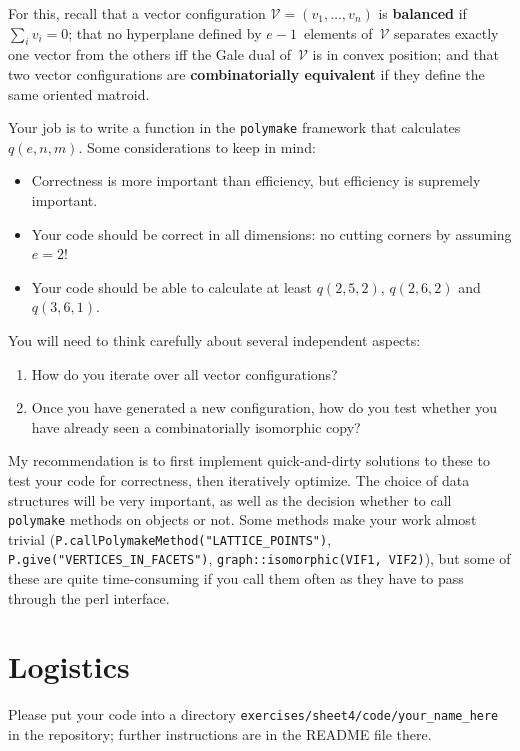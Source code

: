 \documentclass[11pt]{amsart}
\newcommand{\VV}{\mathcal{V}}
\newcommand{\defn}[1]{\textbf{\color{blue}#1}} %
\begin{document}
For this, recall 
that a vector configuration $\VV = (v_1,\dots,v_n)$ is \defn{balanced} if $\sum_i v_i=0$;
that no hyperplane defined by $e-1$~elements of~$\VV$ separates   exactly one vector from the others iff the Gale dual of~$\VV$ is in   convex position;
and that two vector configurations are \defn{combinatorially equivalent} if they define the same oriented matroid.

\bigskip
Your job is to write a function in the \texttt{polymake} framework that calculates $q(e,n,m)$. Some considerations to keep in mind:
\begin{itemize}
\item Correctness is more important than efficiency, but efficiency is supremely important.
\item Your code should be correct in all dimensions: no cutting corners by assuming $e=2$!
\item Your code should be able to calculate at least $q(2,5,2)$, $q(2,6,2)$ and $q(3,6,1)$.
\end{itemize}

You will need to think carefully about several independent aspects:
\begin{enumerate}
\item How do you iterate over all vector configurations?
\item Once you have generated a new configuration, how do you test whether you have already seen a combinatorially isomorphic copy?
\end{enumerate}

My recommendation is to first implement quick-and-dirty solutions to these to test your code for correctness, then iteratively optimize. The choice of data structures will be very important, as well as the decision whether to call \texttt{polymake} methods on objects or not. Some methods make your work almost trivial (\texttt{P.callPolymakeMethod("LATTICE\_POINTS")}, \texttt{P.give("VERTICES\_IN\_FACETS")}, \texttt{graph::isomorphic(VIF1, VIF2)}), but some of these are quite time-consuming if you call them often as they have to pass through the perl interface.

\section*{Logistics}

Please put your code into a directory \texttt{exercises/sheet4/code/your\_name\_here} in the repository; further instructions are in the README file there.
\end{document}
